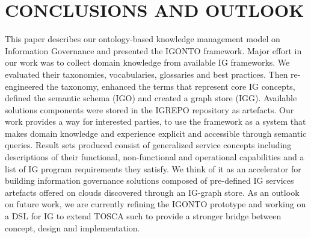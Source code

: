 \section{\uppercase{Conclusions and Outlook}}
\label{sec:conclusion}
This paper describes our ontology-based knowledge management model on Information Governance and presented the IGONTO framework. Major effort in our work was to collect domain knowledge from available IG frameworks. We evaluated their taxonomies, vocabularies, glossaries and best practices. Then re-engineered the taxonomy, enhanced the terms that represent core IG concepts, defined the semantic schema (IGO) and created a graph store (IGG). Available solutions components were stored in the IGREPO repository as artefacts. Our work provides a way for interested parties, to use the framework as a system that makes domain knowledge and experience explicit and accessible through semantic queries. Result sets produced consist of generalized service concepts including descriptions of their functional, non-functional and operational capabilities and a list of IG program requirements they satisfy. We think of it as an accelerator for building information governance solutions composed of pre-defined IG services artefacts offered on clouds discovered through an IG-graph store. As an outlook on future work, we are currently refining the IGONTO prototype and working on a DSL for IG to extend TOSCA such to provide a stronger bridge between concept, design and implementation.